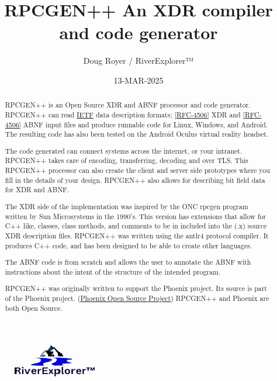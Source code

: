 \documentclass[2pt]{article}
\author{Doug Royer / RiverExplorer™}
\date{13-MAR-2025}
\title{RPCGEN++ An XDR compiler and code generator}
\begin{document}
\maketitle
  \begin{figure}
    \centering
    \includegraphics{RiverExplorerLLC-Logo-BLACK-131x50-Transparent.ps.png}
  \end{figure}
  
\begin{abstract}
  RPCGEN++ is an Open Source XDR and ABNF processor and code generator.
  RPCGEN++ can read \href{https://ietf.org}{IETF} data description
  formats;
  \href{https://datatracker.ietf.org/doc/html/rfc4506}{[RFC-4506]}
  XDR and \href{https://datatracker.ietf.org/doc/html/rfc5234}{[RFC-4506]}
  ABNF input files and produce runnable code for Linux, Windows,
  and Android. The resulting code has also been tested on the Android
  Oculus virtual reality headset.

  The code generated can connect systems across the internet,
  or your intranet.
  RPCGEN++ takes care of encoding, transferring, decoding and over
  TLS. This RPCGEN++ processor can also create the client and server side
  prototypes where you fill in the details of your design.
  RPCGEN++ also allows for describing bit field data for XDR and ABNF.
  
  The XDR side of the implementation was inspired by the ONC
  rpcgen program written by Sun Microsystems
  in the 1990's.
  This version has extensions that allow for C++ like, classes, class
  methods, and comments to be in included into the (.x) source XDR
  description files. RPCGEN++ was written using the antlr4 protocol
  compiler. It produces C++ code, and has been designed to be able
  to create other languages.

  The ABNF code is from scratch and allows the user to annotate
  the ABNF with instructions about the intent of the structure
  of the intended program.
  
  RPCGEN++ was originally written to support the Phoenix project.
  Its source is part of the Phoenix project.
  (\href{https://github.com/RiverExplorer/Phoenix}{Phoenix Open Source Project})
  RPCGEN++ and Phoenix are both Open Source.
\end{abstract}
\tableofcontents

















\end{document}
